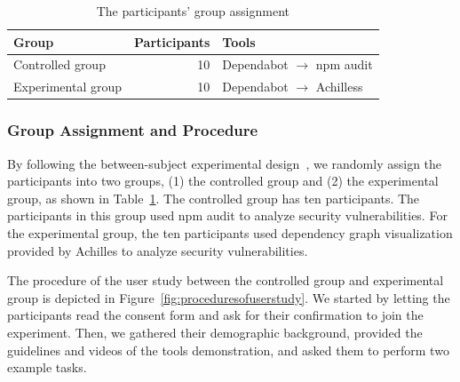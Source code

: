\documentclass[conference]{IEEEtran}
\begin{document}
	\begin{table}[tb]
		\centering
		\caption{The participants' group assignment}
		\begin{tabular}{lrl}
			\toprule
			Group & Participants & Tools \\
			\midrule
			Controlled group & 10 & Dependabot $\rightarrow$ npm audit \\
			\midrule
			Experimental group & 10 & Dependabot $\rightarrow$ Achilless \\
			\bottomrule
		\end{tabular}
		\label{table:group_assignment}
	\end{table}
	
	\subsubsection{Group Assignment and Procedure}
	By following the between-subject experimental design~\citep{Charness2012}, we randomly assign the participants into two groups, (1) the controlled group and (2) the experimental group, as shown in Table~\ref{table:group_assignment}. The controlled group has ten participants. The participants in this group used npm audit to analyze security vulnerabilities. For the experimental group, the ten participants used dependency graph visualization provided by Achilles to analyze security vulnerabilities. 
	
	The procedure of the user study between the controlled group and experimental group is depicted in Figure~\ref{fig:proceduresofuserstudy}.
	We started by letting the participants read the consent form and ask for their confirmation to join the experiment. Then, we gathered their demographic background, provided the guidelines and videos of the tools demonstration, and asked them to perform two example tasks.
	
	
\end{document}
